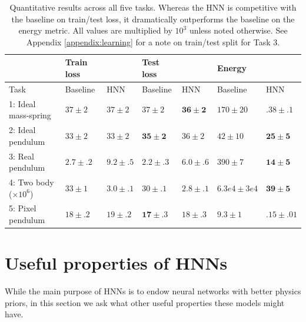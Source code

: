 \documentclass{article}
\begin{document}
\begin{table}[h!]
\centering
\caption{Quantitative results across all five tasks. Whereas the HNN is competitive with the baseline on train/test loss, it dramatically outperforms the baseline on the energy metric. All values are multiplied by $10^{3}$ unless noted otherwise. See Appendix \ref{appendix:learning} for a note on train/test split for Task 3.}
\begin{tabular}{@{}lllllll@{}}
\toprule
& Train loss & & Test loss & & Energy& \\ \midrule
Task & Baseline & HNN & Baseline & HNN & Baseline & HNN \\ \midrule
1: Ideal mass-spring & $37\pm2$ & $37\pm2$ & $37\pm2$ & $\mathbf{36\pm2}$ & $170\pm20$ & $\mathbf{.38\pm.1}$  \\
2: Ideal pendulum   & $33\pm2$ & $33\pm2$ & $\mathbf{35\pm2}$   & $36\pm2$ & $42\pm10$ & $\mathbf{25\pm5}$   \\
3: Real pendulum   & $2.7\pm.2$ & $9.2\pm.5$ & $\mathbf{2.2\pm.3}$   & $6.0\pm.6$ & $390\pm7$  & $\mathbf{14\pm5}$  \\
4: Two body ($\times 10^{6}$) & $33\pm1$ & $3.0\pm.1$ & $30\pm.1$ & $\mathbf{2.8\pm.1}$ & $6.3e4\pm3e4$ & $\mathbf{39\pm5}$  \\
5: Pixel pendulum   & $18\pm.2$ & $19\pm.2$ & $\mathbf{17\pm.3}$   & $18\pm.3$ & $9.3\pm1$ & $\mathbf{.15\pm.01}$   \\ \bottomrule
\end{tabular}
\end{table}
  
  
\section{Useful properties of HNNs}   

While the main purpose of HNNs is to endow neural networks with better physics priors, in this section we ask what other useful properties these models might have.
\end{document}
